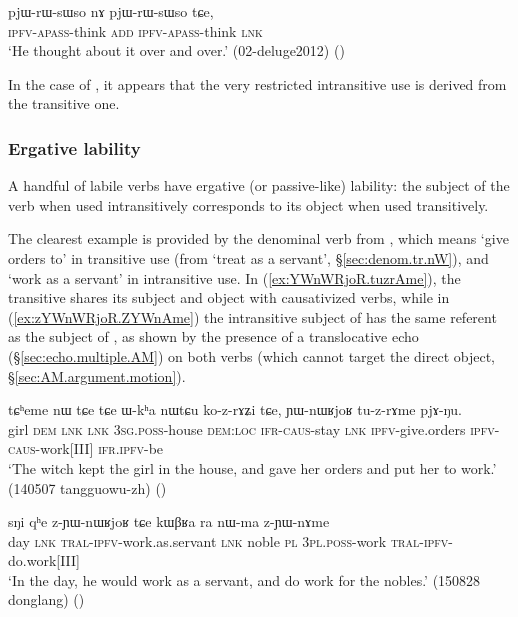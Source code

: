 \begin{exe}
\ex \label{ex:pjWrWsWso}
\gll  pjɯ-rɯ-sɯso nɤ pjɯ-rɯ-sɯso tɕe, \\
\textsc{ipfv}-\textsc{apass}-think \textsc{add} \textsc{ipfv}-\textsc{apass}-think \textsc{lnk} \\
\glt `He thought about it over and over.' (02-deluge2012) ()
\end{exe}

In the case of ,  it appears that the very restricted intransitive use is derived from the transitive one. 

\subsubsection{Ergative lability} \label{sec:lability.pass}
A handful of labile verbs have ergative (or passive-like) lability: the subject of the verb when used intransitively corresponds to its object when used transitively. 

The clearest example is provided by the denominal verb  from , which  means `give orders to' in transitive use (from `treat as a servant', §\ref{sec:denom.tr.nW}), and `work as a servant' in intransitive use. In (\ref{ex:YWnWRjoR.tuzrAme}), the transitive   shares its subject and object with causativized verbs, while in (\ref{ex:zYWnWRjoR.ZYWnAme}) the intransitive subject of  has the same referent as the subject of , as shown by the presence of a translocative echo (§\ref{sec:echo.multiple.AM}) on both verbs (which cannot target the direct object, §\ref{sec:AM.argument.motion}). 

\begin{exe}
\ex \label{ex:YWnWRjoR.tuzrAme}
\gll tɕʰeme nɯ tɕe tɕe ɯ-kʰa nɯtɕu ko-z-rɤʑi tɕe, ɲɯ-nɯʁjoʁ tu-z-rɤme pjɤ-ŋu. \\
girl \textsc{dem} \textsc{lnk} \textsc{lnk} \textsc{3sg}.\textsc{poss}-house \textsc{dem}:\textsc{loc} \textsc{ifr}-\textsc{caus}-stay \textsc{lnk} \textsc{ipfv}-give.orders \textsc{ipfv}-\textsc{caus}-work[III] \textsc{ifr}.\textsc{ipfv}-be \\
\glt `The witch kept the girl in the house, and gave her orders and put her to work.' (140507 tangguowu-zh) ()
\end{exe}


\begin{exe}
\ex \label{ex:zYWnWRjoR.ZYWnAme}
\gll sŋi qʰe z-ɲɯ-nɯʁjoʁ tɕe kɯβʁa ra nɯ-ma z-ɲɯ-nɤme \\
day \textsc{lnk} \textsc{tral}-\textsc{ipfv}-work.as.servant \textsc{lnk} noble \textsc{pl} \textsc{3pl}.\textsc{poss}-work \textsc{tral}-\textsc{ipfv}-do.work[III] \\
\glt `In the day, he would work as a servant, and do work for the nobles.' (150828 donglang)
()
\end{exe}


